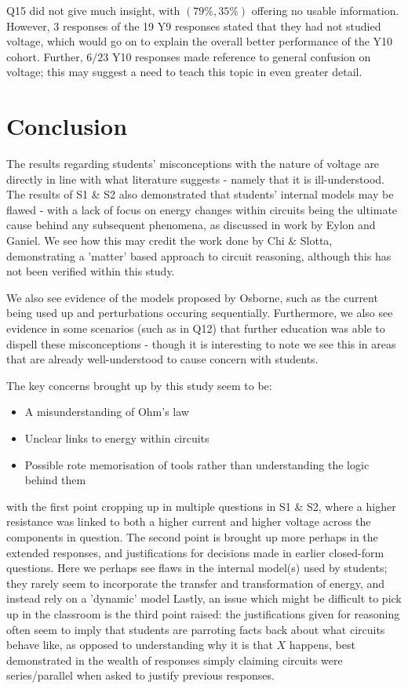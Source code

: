 \documentclass[a4paper,openany,nobib]{tufte-book}
\begin{document}
Q15 did not give much insight, with $(79\%,35\%)$ offering no usable information. However, 3 responses of the 19 Y9 responses stated that they had not studied voltage, which would go on to explain the overall better performance of the Y10 cohort. Further, $6/23$ Y10 responses made reference to general confusion on voltage; this may suggest a need to teach this topic in even greater detail.
\chapter{Conclusion}%

The results regarding students' misconceptions with the nature of voltage are directly in line with what literature suggests - namely that it is ill-understood. The results of S1 \& S2 also demonstrated that students' internal models may be flawed - with a lack of focus on energy changes within circuits being the ultimate cause behind any subsequent phenomena, as discussed in work by Eylon and Ganiel. We see how this may credit the work done by Chi \& Slotta, demonstrating a 'matter' based approach to circuit reasoning, although this has not been verified within this study.

We also see evidence of the models proposed by Osborne, such as the current being used up and perturbations occuring sequentially. Furthermore, we also see evidence in some scenarios (such as in Q12) that further education was able to dispell these misconceptions - though it is interesting to note we see this in areas that are already well-understood to cause concern with students.

The key concerns brought up by this study seem to be:
\begin{itemize}
	\item A misunderstanding of Ohm's law
	\item Unclear links to energy within circuits
	\item Possible rote memorisation of tools rather than understanding the logic behind them
\end{itemize}
with the first point cropping up in multiple questions in S1 \& S2, where a higher resistance was linked to both a higher current and higher voltage across the components in question. The second point is brought up more perhaps in the extended responses, and justifications for decisions made in earlier closed-form questions. Here we perhaps see flaws in the internal model(s) used by students; they rarely seem to incorporate the transfer and transformation of energy, and instead rely on a 'dynamic' model
Lastly, an issue which might be difficult to pick up in the classroom is the third point raised: the justifications given for reasoning often seem to imply that students are parroting facts back about what circuits behave like, as opposed to understanding why it is that $X$ happens, best demonstrated in the wealth of responses simply claiming circuits were series/parallel when asked to justify previous responses.
\end{document}

